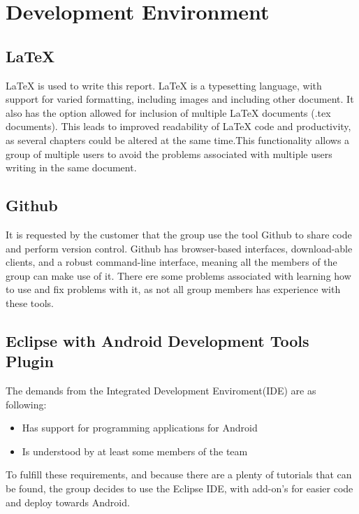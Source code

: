 \chapter{Development Environment}

\section{LaTeX}
LaTeX is used to write this report. LaTeX is a typesetting language, with support for varied formatting, including images and including other document. It also has the option allowed for inclusion of multiple LaTeX documents (.tex documents). This leads to improved readability of LaTeX code and productivity, as several chapters could be altered at the same time.This functionality allows a group of multiple users to avoid the problems associated with multiple users writing in the same document.
\section{Github}

\label{def:githubDev}It is requested by the customer that the group use the tool Github to share code and perform version control. Github has browser-based interfaces, download-able clients, and a robust command-line interface, meaning all the members of the group can make use of it. There ere some problems associated with learning how to use and fix problems with it, as not all group members has experience with these tools. 

\section{Eclipse with Android Development Tools Plugin}
The demands from the Integrated Development Enviroment(IDE) are as following:
\begin{itemize}
\item Has support for programming applications for Android
\item Is understood by at least some members of the team
\end{itemize}
To fulfill these requirements, and because there are a plenty of tutorials that can be found, the group decides to use the Eclipse IDE, with add-on's for easier code and deploy towards Android. 


 
